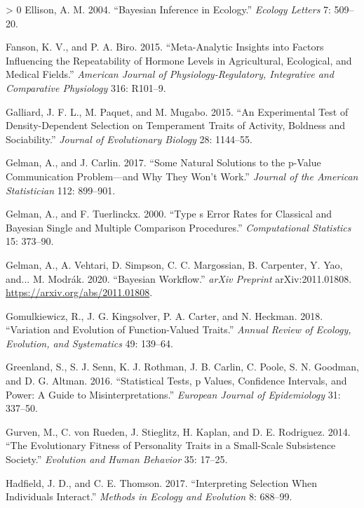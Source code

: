 \documentclass{article}
\newlength{\cslhangindent}
\newenvironment{CSLReferences}[3] %
 {%
  \setlength{\parindent}{0pt}
  \ifodd #1 \everypar{\setlength{\hangindent}{\cslhangindent}}\ignorespaces\fi
  \ifnum #2 > 0
  \setlength{\parskip}{#2\baselineskip}
  \fi
 }%
 {}
\begin{document}
\begin{CSLReferences}{1}{0}
\leavevmode\hypertarget{ref-Ellison2004}{}%
Ellison, A. M. 2004. {``Bayesian Inference in Ecology.''} \emph{Ecology
Letters} 7: 509--20.

\leavevmode\hypertarget{ref-Fanson2019}{}%
Fanson, K. V., and P. A. Biro. 2015. {``Meta-Analytic Insights into
Factors Influencing the Repeatability of Hormone Levels in Agricultural,
Ecological, and Medical Fields.''} \emph{American Journal of
Physiology-Regulatory, Integrative and Comparative Physiology} 316:
R101--9.

\leavevmode\hypertarget{ref-Gall2015}{}%
Galliard, J. F. L., M. Paquet, and M. Mugabo. 2015. {``An Experimental
Test of Density-Dependent Selection on Temperament Traits of Activity,
Boldness and Sociability.''} \emph{Journal of Evolutionary Biology} 28:
1144--55.

\leavevmode\hypertarget{ref-Gelman2017}{}%
Gelman, A., and J. Carlin. 2017. {``Some Natural Solutions to the
p-Value Communication Problem---and Why They Won't Work.''}
\emph{Journal of the American Statistician} 112: 899--901.

\leavevmode\hypertarget{ref-Gelman2000}{}%
Gelman, A., and F. Tuerlinckx. 2000. {``Type s Error Rates for Classical
and Bayesian Single and Multiple Comparison Procedures.''}
\emph{Computational Statistics} 15: 373--90.

\leavevmode\hypertarget{ref-Gelman2020}{}%
Gelman, A., A. Vehtari, D. Simpson, C. C. Margossian, B. Carpenter, Y.
Yao, and... M. Modrák. 2020. {``Bayesian Workflow.''} \emph{arXiv
Preprint} arXiv:2011.01808. \url{https://arxiv.org/abs/2011.01808}.

\leavevmode\hypertarget{ref-Gomulk2018}{}%
Gomulkiewicz, R., J. G. Kingsolver, P. A. Carter, and N. Heckman. 2018.
{``Variation and Evolution of Function-Valued Traits.''} \emph{Annual
Review of Ecology, Evolution, and Systematics} 49: 139--64.

\leavevmode\hypertarget{ref-Green2016}{}%
Greenland, S., S. J. Senn, K. J. Rothman, J. B. Carlin, C. Poole, S. N.
Goodman, and D. G. Altman. 2016. {``Statistical Tests, p Values,
Confidence Intervals, and Power: A Guide to Misinterpretations.''}
\emph{European Journal of Epidemiology} 31: 337--50.

\leavevmode\hypertarget{ref-Gurven2014}{}%
Gurven, M., C. von Rueden, J. Stieglitz, H. Kaplan, and D. E. Rodriguez.
2014. {``The Evolutionary Fitness of Personality Traits in a Small-Scale
Subsistence Society.''} \emph{Evolution and Human Behavior} 35: 17--25.

\leavevmode\hypertarget{ref-Hadfield2017}{}%
Hadfield, J. D., and C. E. Thomson. 2017. {``Interpreting Selection When
Individuals Interact.''} \emph{Methods in Ecology and Evolution} 8:
688--99.


\end{CSLReferences}
\end{document}
